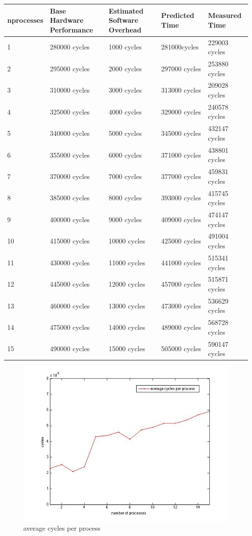 \begin{center}
\begin{tabular}{| p{4cm} | p{2.5cm} | p{2.5cm} | p{2.5cm} | p{2.5cm} |}
nprocesses   & Base Hardware Performance  & Estimated Software Overhead  & Predicted Time  & Measured Time   \\
\hline
1 & 280000 cycles& 1000 cycles& 281000cycles & 229003 cycles\\
2 & 295000 cycles& 2000 cycles& 297000 cycles& 253880 cycles\\
3 & 310000 cycles& 3000 cycles& 313000 cycles& 209028 cycles\\
4 & 325000 cycles& 4000 cycles& 329000 cycles& 240578 cycles\\
5 & 340000 cycles& 5000 cycles& 345000 cycles& 432147 cycles\\
6 & 355000 cycles& 6000 cycles& 371000 cycles& 438801 cycles\\
7 & 370000 cycles& 7000 cycles& 377000 cycles& 459831 cycles\\
8 & 385000 cycles& 8000 cycles& 393000 cycles& 415745 cycles\\
9 & 400000 cycles& 9000 cycles& 409000 cycles& 474147 cycles\\
10 & 415000 cycles& 10000 cycles& 425000 cycles& 491004 cycles\\
11 & 430000 cycles& 11000 cycles& 441000 cycles& 515341 cycles\\
12 & 445000 cycles& 12000 cycles& 457000 cycles& 515871 cycles\\
13 & 460000 cycles& 13000 cycles& 473000 cycles& 536629 cycles\\
14 & 475000 cycles& 14000 cycles& 489000 cycles& 568728 cycles\\
15 & 490000 cycles& 15000 cycles& 505000 cycles& 590147 cycles\\

\end{tabular}
\end{center}

\begin{figure}[htbp] %
   \centering
   \includegraphics[width=4.5in]{./pics/44.jpg} 
   \caption{average cycles per process}
   \label{fig:average cycles per process}
\end{figure}


